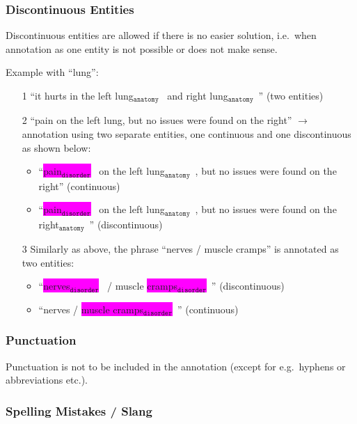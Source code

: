 \documentclass[12pt]{article}
\theoremstyle{definition}
\newcommand{\anatomy}[1]{\colorbox{dollarbill}{#1$_{\texttt{anatomy}}$}\ }
\newcommand{\disorder}[1]{\colorbox{fuchsia}{#1$_{\texttt{disorder}}$}\ }
\begin{document}
\subsubsection*{Discontinuous Entities}

Discontinuous entities are allowed if there is no easier solution, i.e.~when annotation as one entity is not possible or does not make sense.

Example with ``lung'':
\begin{enumerate}
    \item[1] ``it hurts in the \anatomy{left lung} and \anatomy{right lung}'' (two entities)
    
    \item[2] ``pain on the left lung, but no issues were found on the right'' $\rightarrow$ annotation using two separate entities, one continuous and one discontinuous as shown below:
    \begin{itemize}
        \item ``\disorder{pain} on the \anatomy{left lung}, but no issues were found on the right'' (continuous)
        \item ``\disorder{pain} on the left \anatomy{lung}, but no issues were found on the \anatomy{right}'' (discontinuous) 
    \end{itemize}

    \item[3] Similarly as above, the phrase ``nerves / muscle cramps'' is annotated as two entities:
    \begin{itemize}
        \item ``\disorder{nerves} / muscle \disorder{cramps}'' (discontinuous)
        \item ``nerves / \disorder{muscle cramps}'' (continuous)
    \end{itemize}


\end{enumerate}



\subsubsection*{Punctuation}

Punctuation is not to be included in the annotation (except for e.g.~hyphens or abbreviations etc.).

\subsubsection*{Spelling Mistakes / Slang}
\end{document}

